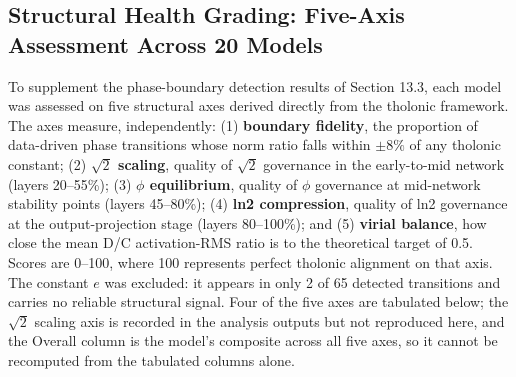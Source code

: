 \documentclass[12pt]{article}
\begin{document}
\subsection{Structural Health Grading: Five-Axis Assessment Across 20 Models}\label{structural-health-grading-five-axis-assessment-across-20-models}

To supplement the phase-boundary detection results of Section 13.3, each
model was assessed on five structural axes derived directly from the
tholonic framework. The axes measure, independently: (1)
\textbf{boundary fidelity}, the proportion of data-driven phase
transitions whose norm ratio falls within \(\pm 8\%\) of any tholonic
constant; (2) \textbf{\(\sqrt{2}\) scaling}, quality of \(\sqrt{2}\)
governance in the early-to-mid network (layers 20--55\%); (3)
\textbf{\(\phi\) equilibrium}, quality of \(\phi\) governance at
mid-network stability points (layers 45--80\%); (4) \textbf{ln2
compression}, quality of ln2 governance at the output-projection stage
(layers 80--100\%); and (5) \textbf{virial balance}, how close the mean
D/C activation-RMS ratio is to the theoretical target of 0.5. Scores are
0--100, where 100 represents perfect tholonic alignment on that axis.
The constant \(e\) was excluded: it appears in only 2 of 65 detected
transitions and carries no reliable structural signal. Four of the five
axes are tabulated below; the \(\sqrt{2}\) scaling axis is recorded in
the analysis outputs but not reproduced here, and the Overall column is
the model's composite across all five axes, so it cannot be recomputed
from the tabulated columns alone.
\end{document}
